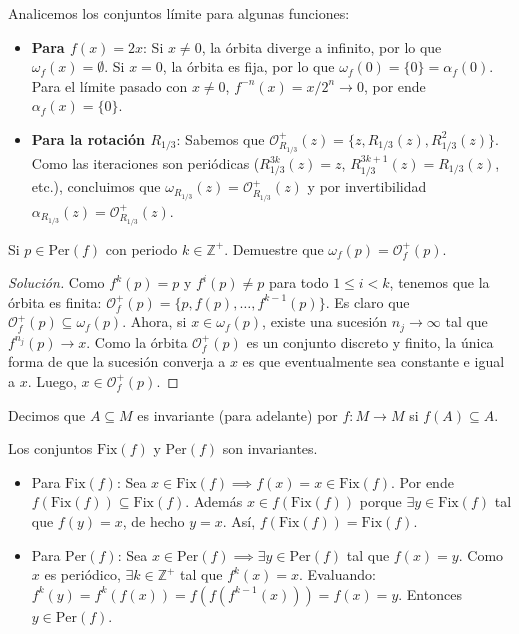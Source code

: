 \begin{ejemplo}
	Analicemos los conjuntos límite para algunas funciones:
	\begin{itemize}
		\item \textbf{Para $f(x)=2x$}: 
		Si $x \neq 0$, la órbita diverge a infinito, por lo que $\omega_f(x) = \emptyset$.
		Si $x = 0$, la órbita es fija, por lo que $\omega_f(0) = \{0\} = \alpha_f(0)$.
		Para el límite pasado con $x \neq 0$, $f^{-n}(x) = x/2^n \to 0$, por ende $\alpha_f(x) = \{0\}$.
		
		\item \textbf{Para la rotación $R_{1/3}$}:
		Sabemos que $\mathcal{O}_{R_{1/3}}^+(z) = \{z, R_{1/3}(z), R_{1/3}^2(z)\}$.
		Como las iteraciones son periódicas ($R_{1/3}^{3k}(z) = z$, $R_{1/3}^{3k+1}(z) = R_{1/3}(z)$, etc.), concluimos que $\omega_{R_{1/3}}(z) = \mathcal{O}_{R_{1/3}}^+(z)$ y por invertibilidad $\alpha_{R_{1/3}}(z) = \mathcal{O}_{R_{1/3}}^+(z)$.
	\end{itemize}
\end{ejemplo}

\begin{ejercicio}
	Si $p \in \text{Per}(f)$ con periodo $k \in \mathbb{Z}^+$. Demuestre que $\omega_f(p) = \mathcal{O}_f^+(p)$.
\end{ejercicio}
\begin{proof}[Solución]
	Como $f^k(p) = p$ y $f^i(p) \neq p$ para todo $1 \le i < k$, tenemos que la órbita es finita: $\mathcal{O}_f^+(p) = \{p, f(p), \dots, f^{k-1}(p)\}$. Es claro que $\mathcal{O}_f^+(p) \subseteq \omega_f(p)$.
	Ahora, si $x \in \omega_f(p)$, existe una sucesión $n_j \to \infty$ tal que $f^{n_j}(p) \to x$. Como la órbita $\mathcal{O}_f^+(p)$ es un conjunto discreto y finito, la única forma de que la sucesión converja a $x$ es que eventualmente sea constante e igual a $x$. Luego, $x \in \mathcal{O}_f^+(p)$.
\end{proof}

\begin{definicion}
	Decimos que $A \subseteq M$ es invariante (para adelante) por $f: M \to M$ si $f(A) \subseteq A$.
\end{definicion}

\begin{ejemplo}
	Los conjuntos $\text{Fix}(f)$ y $\text{Per}(f)$ son invariantes.
	\begin{itemize}
		\item Para $\text{Fix}(f)$: Sea $x \in \text{Fix}(f) \implies f(x) = x \in \text{Fix}(f)$. Por ende $f(\text{Fix}(f)) \subseteq \text{Fix}(f)$. Además $x \in f(\text{Fix}(f))$ porque $\exists y \in \text{Fix}(f)$ tal que $f(y)=x$, de hecho $y=x$. Así, $f(\text{Fix}(f)) = \text{Fix}(f)$.
		\item Para $\text{Per}(f)$: Sea $x \in \text{Per}(f) \implies \exists y \in \text{Per}(f)$ tal que $f(x)=y$. Como $x$ es periódico, $\exists k \in \mathbb{Z}^+$ tal que $f^k(x)=x$. Evaluando: $f^k(y) = f^k(f(x)) = f(f(f^{k-1}(x))) = f(x) = y$. Entonces $y \in \text{Per}(f)$.
	\end{itemize}
\end{ejemplo}

